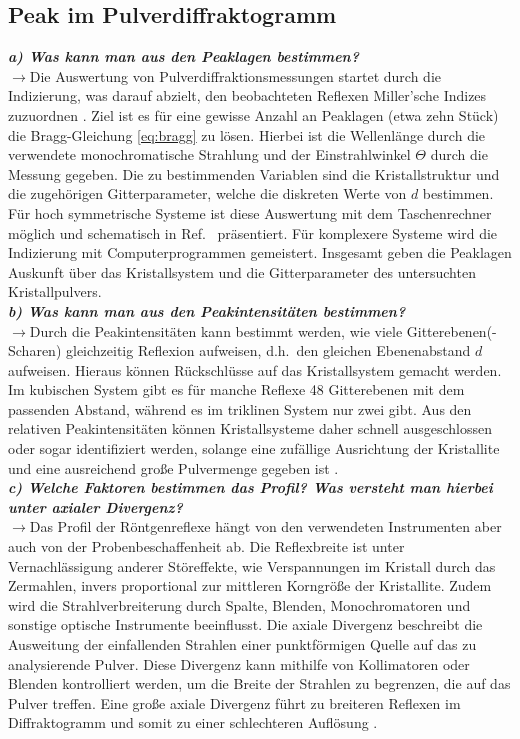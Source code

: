 \subsection{\label{subsec:FZV7}Peak im Pulverdiffraktogramm}
\textbf{\textit{a) Was kann man aus den Peaklagen bestimmen?}}\\
$\rightarrow$Die Auswertung von Pulverdiffraktionsmessungen startet durch die Indizierung, 
was darauf abzielt, den beobachteten Reflexen Miller'sche Indizes zuzuordnen \cite{Kristall}. 
Ziel ist es für eine gewisse Anzahl an Peaklagen (etwa zehn Stück) die Bragg-Gleichung \eqref{eq:bragg}
zu lösen. Hierbei ist die Wellenlänge durch die verwendete monochromatische Strahlung und der 
Einstrahlwinkel $\Theta$ durch die Messung gegeben. Die zu bestimmenden Variablen sind die 
Kristallstruktur und die zugehörigen Gitterparameter, welche die diskreten Werte von $d$ bestimmen.
Für hoch symmetrische Systeme ist diese Auswertung mit dem Taschenrechner möglich und schematisch in 
Ref.~\cite{Kristall} präsentiert. Für komplexere Systeme wird die Indizierung mit Computerprogrammen 
gemeistert. Insgesamt geben die Peaklagen Auskunft über das Kristallsystem und 
die Gitterparameter des untersuchten Kristallpulvers. \\

\textbf{\textit{b) Was kann man aus den Peakintensitäten bestimmen?}}\\
$\rightarrow$Durch die Peakintensitäten kann bestimmt werden, wie viele Gitterebenen(-Scharen) gleichzeitig 
Reflexion aufweisen, d.h.~den gleichen Ebenenabstand $d$ aufweisen. Hieraus können Rückschlüsse auf das 
Kristallsystem gemacht werden. Im kubischen System gibt es für manche Reflexe 48 Gitterebenen mit dem passenden Abstand, 
während es im triklinen System nur zwei gibt. Aus den relativen Peakintensitäten können Kristallsysteme daher schnell 
ausgeschlossen oder sogar identifiziert werden, solange eine zufällige Ausrichtung der Kristallite und eine ausreichend 
große Pulvermenge gegeben ist \cite{Kristall}. \\

\textbf{\textit{c) Welche Faktoren bestimmen das Profil? Was versteht man hierbei unter
axialer Divergenz?}}\\
$\rightarrow$Das Profil der Röntgenreflexe hängt von den verwendeten Instrumenten aber auch von der Probenbeschaffenheit 
ab. Die Reflexbreite ist unter Vernachlässigung anderer Störeffekte, wie Verspannungen im Kristall durch das Zermahlen,
invers proportional zur mittleren Korngröße der Kristallite. Zudem wird die Strahlverbreiterung durch Spalte, Blenden, 
Monochromatoren und sonstige optische Instrumente beeinflusst.
Die axiale Divergenz beschreibt die Ausweitung der einfallenden Strahlen einer punktförmigen Quelle 
auf das zu analysierende Pulver. 
Diese Divergenz kann mithilfe von Kollimatoren oder Blenden kontrolliert werden, 
um die Breite der Strahlen zu begrenzen, die auf das Pulver treffen. 
Eine große axiale Divergenz führt zu breiteren Reflexen im Diffraktogramm und somit zu einer 
schlechteren Auflösung \cite{Kristall}. \\

